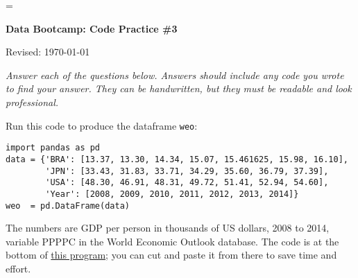\documentclass[11pt]{exam}
\begin{document}
\parskip=\bigskipamount
\parindent=0.0in
\thispagestyle{empty}


\bigskip\bigskip
\centerline{\Large \bf Data Bootcamp:  Code Practice \#3}
\centerline{Revised: \today}

{\it Answer each of the questions below.
Answers should include any code you wrote to find your answer.  
They can be handwritten, but they must be readable and look professional.}


Run this code to produce the dataframe \texttt{weo}:  
\vspace{-0.15in} 
\begin{verbatim}
import pandas as pd 
data = {'BRA': [13.37, 13.30, 14.34, 15.07, 15.461625, 15.98, 16.10],
        'JPN': [33.43, 31.83, 33.71, 34.29, 35.60, 36.79, 37.39],
        'USA': [48.30, 46.91, 48.31, 49.72, 51.41, 52.94, 54.60], 
        'Year': [2008, 2009, 2010, 2011, 2012, 2013, 2014]}
weo  = pd.DataFrame(data)
\end{verbatim}
\vspace{-0.15in} 
The numbers are GDP per person in thousands of US dollars, 2008 to 2014, 
variable PPPPC in the World Economic Outlook database. 
The code is at the bottom of 
\href{https://github.com/DaveBackus/Data_Bootcamp/blob/master/Code/Python/bootcamp_pandas_1.py}
{this program}; 
you can cut and paste it from there to save time and effort. 
\end{document}
